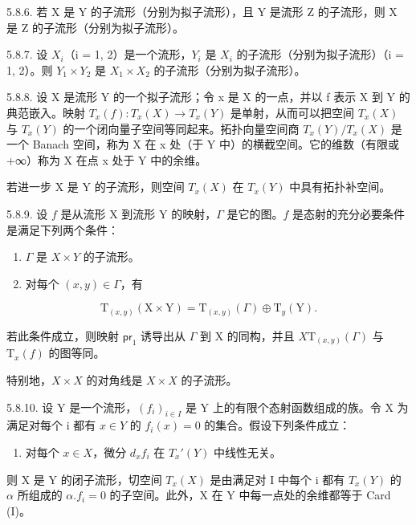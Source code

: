 5.8.6. 若 X 是 Y 的子流形（分别为拟子流形），且 Y 是流形 Z 的子流形，则 X 是 Z 的子流形（分别为拟子流形）。

5.8.7. 设 \(X_{i}\)（i = 1, 2）是一个流形，\(Y_{i}\) 是 \(X_{i}\) 的子流形（分别为拟子流形）（i = 1, 2）。则 \(Y_{1} \times Y_{2}\) 是 \(X_{1} \times X_{2}\) 的子流形（分别为拟子流形）。

5.8.8. 设 X 是流形 Y 的一个拟子流形；令 x 是 X 的一点，并以 f 表示 X 到 Y 的典范嵌入。映射 \(T_{x}(f):T_{x}(X)\to T_{x}(Y)\) 是单射，从而可以把空间 \(T_{x}(X)\) 与 \(T_{x}(Y)\) 的一个闭向量子空间等同起来。拓扑向量空间商 \(T_{x}(Y)/T_{x}(X)\) 是一个 Banach 空间，称为 X 在 x 处（于 Y 中）的横截空间。它的维数（有限或 +∞）称为 X 在点 x 处于 Y 中的余维。

若进一步 X 是 Y 的子流形，则空间 \(T_{x}(X)\) 在 \(T_{x}(Y)\) 中具有拓扑补空间。

5.8.9. 设 \(f\) 是从流形 X 到流形 Y 的映射，\(\Gamma\) 是它的图。\(f\) 是态射的充分必要条件是满足下列两个条件：

\begin{enumerate}
\def\labelenumi{(\roman{enumi})}
\item
  \(\Gamma\) 是 \(X \times Y\) 的子流形。
\item
  对每个 \((x, y) \in \Gamma\)，有
\end{enumerate}

\[
\mathrm{T} _ {(x, y)} (\mathrm{X} \times \mathrm{Y}) = \mathrm{T} _ {(x, y)} (\Gamma) \oplus \mathrm{T} _ {y} (\mathrm{Y}).
\]

若此条件成立，则映射 \(\mathsf{pr}_1\) 诱导出从 \(\Gamma\) 到 X 的同构，并且 \(X\)\(\mathrm{T}_{(x,y)}(\Gamma)\) 与 \(\mathrm{T}_x(f)\) 的图等同。

特别地，\(X \times X\) 的对角线是 \(X \times X\) 的子流形。

5.8.10. 设 Y 是一个流形，\((f_{i})_{i\in I}\) 是 Y 上的有限个态射函数组成的族。令 X 为满足对每个 i 都有 \(x\in Y\) 的 \(f_{i}(x)=0\) 的集合。假设下列条件成立：

\begin{enumerate}
\def\labelenumi{(\Alph{enumi})}
\setcounter{enumi}{9}
\tightlist
\item
  对每个 \(x \in X\)，微分 \(d_x f_i\) 在 \(T_x'(Y)\) 中线性无关。
\end{enumerate}

则 X 是 Y 的闭子流形，切空间 \(T_{x}(X)\) 是由满足对 I 中每个 i 都有 \(T_{x}(Y)\) 的 \(\alpha\) 所组成的 \(\alpha.f_{i}=0\) 的子空间。此外，X 在 Y 中每一点处的余维都等于 Card (I)。

